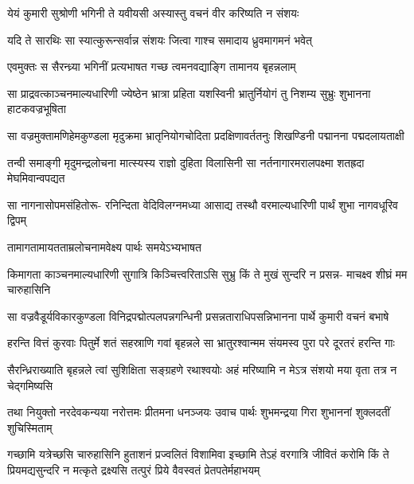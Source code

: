 \twolineshloka
{येयं कुमारी सुश्रोणी भगिनी ते यवीयसी}
{अस्यास्तु वचनं वीर करिष्यति न संशयः}


\twolineshloka
{यदि ते सारथिः सा स्यात्कुरून्सर्वान्न संशयः}
{जित्वा गाश्च समादाय ध्रुवमागमनं भवेत्}



\twolineshloka
{एवमुक्तः स सैरन्ध्र्या भगिनीं प्रत्यभाषत}
{गच्छ त्वमनवद्याङ्गि तामानय बृहन्नलाम्}


\fourlineindentedshloka
{सा प्राद्रवत्काञ्चनमाल्यधारिणी}
{ज्येष्ठेन भ्रात्रा प्रहिता यशस्विनी}
{भ्रातुर्नियोगं तु निशम्य सुभ्रुः}
{शुभानना हाटकवज्रभूषिता}


\fourlineindentedshloka
{सा वज्रमुक्तामणिहेमकुण्डला}
{मृदुक्रमा भ्रातृनियोगचोदिता}
{प्रदक्षिणावर्ततनुः शिखण्डिनी}
{पद्मानना पद्मदलायताक्षी}


\fourlineindentedshloka
{तन्वी समाङ्गी मृदुमन्द्रलोचना}
{मात्स्यस्य राज्ञो दुहिता विलासिनी}
{सा नर्तनागारमरालपक्ष्मा}
{शतह्रदा मेघमिवान्वपद्यत}


\fourlineindentedshloka
{सा नागनासोपमसंहितोरू-}
{रनिन्दिता वेदिविलग्नमध्या}
{आसाद्य तस्थौ वरमाल्यधारिणी}
{पार्थं शुभा नागवधूरिव द्विपम्}


\onelineshloka
{तामागतामायतताम्रलोचनामवेक्ष्य पार्थः समयेऽभ्यभाषत}

\fourlineindentedshloka
{किमागता काञ्चनमाल्यधारिणी}
{सुगात्रि किञ्चित्त्वरिताऽसि सुभ्रु}
{किं ते मुखं सुन्दरि न प्रसन्न-}
{माचक्ष्व शीघ्रं मम चारुहासिनि}



\twolineshloka
{सा वज्रवैडूर्यविकारकुण्डला विनिद्रपद्मोत्पलपन्नगन्धिनी}
{प्रसन्नताराधिपसन्निभानना पार्थे कुमारी वचनं बभाषे}




\twolineshloka
{हरन्ति वित्तं कुरवाः पितुर्मे शतं सहस्राणि गवां बृहन्नले}
{सा भ्रातुरश्वान्मम संयमस्व पुरा परे दूरतरं हरन्ति गाः}


\twolineshloka
{सैरन्ध्रिराख्याति बृहन्नले त्वां सुशिक्षिता सङ्ग्रहणे रथाश्वयोः}
{अहं मरिष्यामि न मेऽत्र संशयो मया वृता तत्र न चेद्गमिष्यसि}



\twolineshloka
{तथा नियुक्तो नरदेवकन्यया नरोत्तमः प्रीतमना धनञ्जयः}
{उवाच पार्थः शुभमन्द्रया गिरा शुभाननां शुक्लदतीं शुचिस्मिताम्}


\threelineshloka
{गच्छामि यत्रेच्छसि चारुहासिनि हुताशनं प्रज्वलितं विशामिवा}
{इच्छामि तेऽहं वरगात्रि जीवितं करोमि किं ते प्रियमद्यसुन्दरि}
{न मत्कृते द्रक्ष्यसि तत्पुरं प्रिये वैवस्वतं प्रेतपतेर्महाभयम्}


